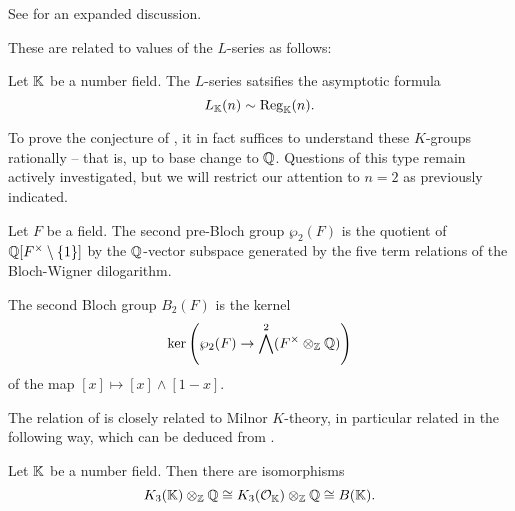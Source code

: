 \begin{remark}
    See \cite[\S IV.1.18.1]{Weibel} for an expanded discussion.
\end{remark}
These are related to values of the $L$-series as follows:
\begin{theorem}\label{thm: Borel regulator and }
    Let $\mathbb{K}$ be a number field. The $L$-series satsifies the asymptotic formula 
    \begin{equation}\label{eqn: L-series asymptotic formula}
        L_{\mathbb{K}}(n)\sim\mathrm{Reg}_{\mathbb{K}}(n).
    \end{equation}
\end{theorem}
To prove the conjecture of , it in fact suffices to understand these $K$-groups rationally -- that is, up to base change to $\mathbb{Q}$. Questions of this type remain actively investigated, but we will restrict our attention to $n=2$ as previously indicated. 
\begin{definition}\label{def: pre-Bloch group}
    Let $F$ be a field. The second pre-Bloch group $\wp_{2}(F)$ is the quotient of $\mathbb{Q}[F^{\times}\setminus\{1\}]$ by the $\mathbb{Q}$-vector subspace generated by the five term relations of the Bloch-Wigner dilogarithm. 
\end{definition}
\begin{definition}\label{def: Bloch group}
    The second Bloch group $B_{2}(F)$ is the kernel 
    $$\ker\left(\wp_{2}(F)\to\bigwedge^{2}(F^{\times}\otimes_{\mathbb{Z}}\mathbb{Q})\right)$$
    of the map $[x]\mapsto[x]\wedge[1-x]$. 
\end{definition}
The relation of  is closely related to Milnor $K$-theory, in particular related in the following way, which can be deduced from \cite[\S 1.5, Thm. 8]{KThyHandbook}.
\begin{theorem}[Bloch]\label{thm: Bloch rational computation of K3}
    Let $\mathbb{K}$ be a number field. Then there are isomorphisms
    $$K_{3}(\mathbb{K})\otimes_{\mathbb{Z}}\mathbb{Q}\cong K_{3}(\mathcal{O}_{\mathbb{K}})\otimes_{\mathbb{Z}}\mathbb{Q}\cong B(\mathbb{K}).$$
\end{theorem}
